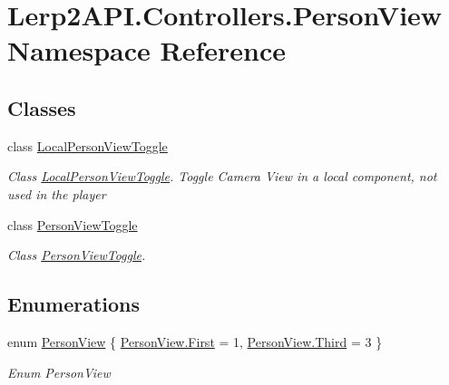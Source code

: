\hypertarget{namespace_lerp2_a_p_i_1_1_controllers_1_1_person_view}{}\section{Lerp2\+A\+P\+I.\+Controllers.\+Person\+View Namespace Reference}
\label{namespace_lerp2_a_p_i_1_1_controllers_1_1_person_view}
\subsection*{Classes}
\begin{DoxyCompactItemize}
\item 
class \hyperlink{class_lerp2_a_p_i_1_1_controllers_1_1_person_view_1_1_local_person_view_toggle}{Local\+Person\+View\+Toggle}
\begin{DoxyCompactList}\small\item\em Class \hyperlink{class_lerp2_a_p_i_1_1_controllers_1_1_person_view_1_1_local_person_view_toggle}{Local\+Person\+View\+Toggle}. Toggle Camera View in a local component, not used in the player \end{DoxyCompactList}\item 
class \hyperlink{class_lerp2_a_p_i_1_1_controllers_1_1_person_view_1_1_person_view_toggle}{Person\+View\+Toggle}
\begin{DoxyCompactList}\small\item\em Class \hyperlink{class_lerp2_a_p_i_1_1_controllers_1_1_person_view_1_1_person_view_toggle}{Person\+View\+Toggle}. \end{DoxyCompactList}\end{DoxyCompactItemize}
\subsection*{Enumerations}
\begin{DoxyCompactItemize}
\item 
enum \hyperlink{namespace_lerp2_a_p_i_1_1_controllers_1_1_person_view_a3d0b30b4a4e8e12044ec2f5a78cec0ca}{Person\+View} \{ \hyperlink{namespace_lerp2_a_p_i_1_1_controllers_1_1_person_view_a3d0b30b4a4e8e12044ec2f5a78cec0caa7fb55ed0b7a30342ba6da306428cae04}{Person\+View.\+First} = 1, 
\hyperlink{namespace_lerp2_a_p_i_1_1_controllers_1_1_person_view_a3d0b30b4a4e8e12044ec2f5a78cec0caa168909c0b6f1dfbd48f679d47059c1d6}{Person\+View.\+Third} = 3
 \}\begin{DoxyCompactList}\small\item\em Enum Person\+View \end{DoxyCompactList}
\end{DoxyCompactItemize}


